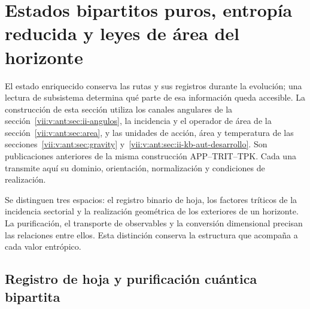 
\section{Estados bipartitos puros, entropía reducida y leyes de área del horizonte}
\label{vii:vii:sec:horizontes-informacion}

El estado enriquecido conserva las rutas y sus registros durante la
evolución; una lectura de subsistema determina qué parte de esa información
queda accesible. La construcción de esta sección utiliza los canales
angulares de la sección~\ref{vii:v:ant:sec:ii-angulos}, la incidencia y el
operador de área de la sección~\ref{vii:v:ant:sec:area}, y las unidades
de acción, área y temperatura de las
secciones~\ref{vii:v:ant:sec:gravity}
y~\ref{vii:v:ant:sec:ii-kb-aut-desarrollo}. Son publicaciones anteriores de la
misma construcción APP--TRIT--TPK. Cada una transmite aquí su dominio,
orientación, normalización y condiciones de realización.

Se distinguen tres espacios: el registro binario de hoja, los factores
tríticos de la incidencia sectorial y la realización geométrica de los
exteriores de un horizonte. La purificación, el transporte de observables
y la conversión dimensional precisan las relaciones entre ellos. Esta
distinción conserva la estructura que acompaña a cada valor entrópico.

\subsection{Registro de hoja y purificación cuántica bipartita}
\label{vii:vii:subsec:hojas-purificacion}

